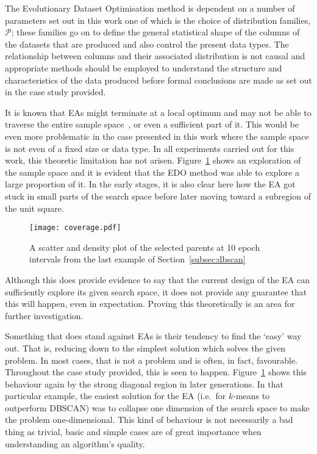The Evolutionary Dataset Optimisation method is dependent on a number of
parameters set out in this work one of which is the choice of distribution
families, \(\mathcal{P}\); these families go on to define the general
statistical shape of the columns of the datasets that are produced and also
control the present data types. The relationship between columns and their
associated distribution is not causal and appropriate methods should be employed
to understand the structure and characteristics of the data produced before
formal conclusions are made as set out in the case study provided.

It is known that EAs might terminate at a local optimum and may not be able to
traverse the entire sample space~\cite{Vikhar2016}, or even a sufficient part of
it. This would be even more problematic in the case presented in this work where
the sample space is not even of a fixed size or data type. In all experiments
carried out for this work, this theoretic limitation has not arisen.
Figure~\ref{fig:coverage} shows an exploration of the sample space and it is
evident that the EDO method was able to explore a large proportion of it. In the
early stages, it is also clear here how the EA got stuck in small parts of the
search space before later moving toward a subregion of the unit square.

\begin{figure}[htbp]
    \texttt{[image: coverage.pdf]}
    \caption{%
        A scatter and density plot of the selected parents at 10 epoch intervals
        from the last example of Section~\ref{subsec:dbscan}
    }\label{fig:coverage}
\end{figure}

Although this does provide evidence to say that the current design of the EA can
sufficiently explore its given search space, it does not provide any guarantee
that this will happen, even in expectation. Proving this theoretically is an
area for further investigation.

Something that does stand against EAs is their tendency to find the `easy' way
out. That is, reducing down to the simplest solution which solves the given
problem. In most cases, that is not a problem and is often, in fact, favourable.
Throughout the case study provided, this is seen to happen.
Figure~\ref{fig:coverage} shows this behaviour again by the strong diagonal
region in later generations. In that particular example, the easiest solution
for the EA (i.e.\ for \(k\)-means to outperform DBSCAN) was to collapse one
dimension of the search space to make the problem one-dimensional. This kind of
behaviour is not necessarily a bad thing as trivial, basic and simple cases are
of great importance when understanding an algorithm's quality.

